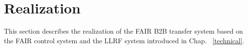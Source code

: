 %
% 
\section{Realization}
\label{cpt_func}
This section describes the realization of the FAIR B2B transfer system based on the FAIR control system and the LLRF system introduced in Chap. ~\ref{technical}.

